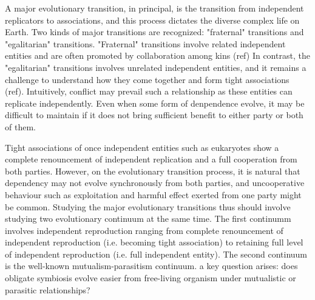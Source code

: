 \documentclass[11pt]{article}
\begin{document}


A major evolutionary transition, in principal, is the transition from independent replicators to associations, and this process dictates the diverse complex life on Earth.
Two kinds of major transitions are recognized: "fraternal" transitions and "egalitarian" transitions. 
"Fraternal" transitions involve related independent entities and are often promoted by collaboration among kins (ref)
In contrast, the "egalitarian" transitions involves unrelated independent entities, and it remains a challenge to understand  how they come together and form tight associations (ref).
Intuitively, conflict may prevail such a relationship as these entities can replicate independently.
Even when some form of denpendence evolve, it may be difficult to maintain if it does not bring sufficient benefit to either party or both of them.

Tight associations of once independent entities such as eukaryotes show a complete renouncement of independent replication and a full cooperation from both parties.
However, on the evolutionary transition process, it is natural that dependency may not evolve synchronously from both parties, and uncooperative behaviour such as exploitation and harmful effect exerted from one party might be common.
Studying the major evolutionary transitions thus should involve studying two evolutionary continuum at the same time. 
The first continumm involves independent reproduction ranging from complete renouncement of independent reproduction (i.e. becoming tight association) to retaining full level of independent reproduction (i.e. full independent entity).
The second continuum is the well-known mutualism-parasitism continuum.
a key question arises: does obligate symbiosis evolve easier from free-living organism under mutualistic or parasitic relationships? 
\end{document}
